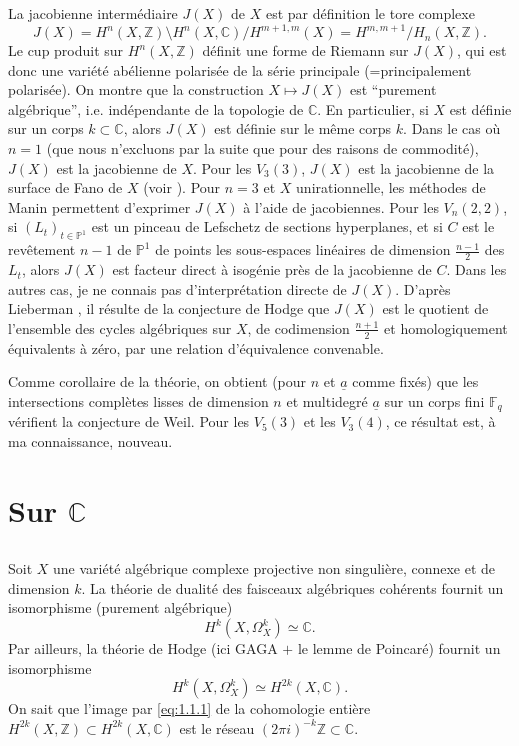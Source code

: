 \documentclass[10pt,leqno]{amsart}
\theoremstyle{plain}
\theoremstyle{definition}
\theoremstyle{remark}
\newcommand{\ZZ}{\mathbb{Z}}
\newcommand{\CC}{\mathbb{C}}
\newcommand{\PP}{\mathbb{P}}
\newcommand{\FF}{\mathbb{F}}
\newcommand{\ua}{\underline{a}}
\begin{document}
La jacobienne interm\'ediaire $J(X)$ de $X$ est par d\'efinition le tore complexe
\[
J(X)=H^n(X,\ZZ)\setminus H^n(X,\CC)/H^{m+1,m}(X)=H^{m,m+1}/H_n(X,\ZZ).
\]
Le cup produit sur $H^n(X,\ZZ)$ d\'efinit une forme de Riemann sur $J(X)$, qui est donc une vari\'et\'e ab\'elienne polaris\'ee de la s\'erie principale (=principalement polaris\'ee). On montre que la construction $X\mapsto J(X)$ est ``purement alg\'ebrique'', i.e. ind\'ependante de la topologie de $\CC$. En particulier, si $X$ est d\'efinie sur un corps $k\subset\CC$, alors $J(X)$ est d\'efinie sur le m\^eme corps $k$. Dans le cas o\`u $n=1$ (que nous n'excluons par la suite que pour des raisons de commodit\'e), $J(X)$ est la jacobienne de $X$. Pour les $V_3(3)$, $J(X)$ est la jacobienne de la surface de Fano de $X$ (voir \cite{1}). Pour $n=3$ et $X$ unirationnelle, les m\'ethodes de Manin \cite{8} permettent d'exprimer $J(X)$ \`a l'aide de jacobiennes. Pour les $V_n(2,2)$, si $(L_t)_{t\in\PP^1}$ est un pinceau de Lefschetz de sections hyperplanes, et si $C$ est le rev\^etement $n-1$ de $\PP^1$ de points les sous-espaces lin\'eaires de dimension $\frac{n-1}{2}$ des $L_t$, alors $J(X)$ est facteur direct \`a isog\'enie pr\`es de la jacobienne de $C$. Dans les autres cas, je ne connais pas d'interpr\'etation directe de $J(X)$. D'apr\`es Lieberman \cite{7}, il r\'esulte de la conjecture de Hodge que $J(X)$ est le quotient de l'ensemble des cycles alg\'ebriques sur $X$, de codimension $\frac{n+1}{2}$ et homologiquement \'equivalents \`a z\'ero, par une relation d'\'equivalence convenable.

Comme corollaire de la th\'eorie, on obtient (pour $n$ et $\ua$ comme fix\'es) que les intersections compl\`etes lisses de dimension $n$ et multidegr\'e $\ua$ sur un corps fini $\FF_q$ v\'erifient la conjecture de Weil. Pour les $V_5(3)$ et les $V_3(4)$, ce r\'esultat est, \`a ma connaissance, nouveau.

\section{Sur $\CC$}

\subsection{}\label{1.1}

Soit $X$ une vari\'et\'e alg\'ebrique complexe projective non singuli\`ere, connexe et de dimension $k$. La th\'eorie de dualit\'e des faisceaux alg\'ebriques coh\'erents fournit un isomorphisme (purement alg\'ebrique)
\begin{equation}\label{eq:1.1.1}
H^k(X,\Omega_X^k)\simeq\CC.
\end{equation}
Par ailleurs, la th\'eorie de Hodge (ici GAGA $+$ le lemme de Poincar\'e) fournit un isomorphisme
\begin{equation}\label{eq:1.1.2}
H^k(X,\Omega_X^k)\simeq H^{2k}(X,\CC).
\end{equation}
On sait que l'image par \eqref{eq:1.1.1} de la cohomologie enti\`ere $H^{2k}(X,\ZZ)\subset H^{2k}(X,\CC)$ est le r\'eseau $(2\pi i)^{-k}\ZZ\subset\CC$.
\end{document}
